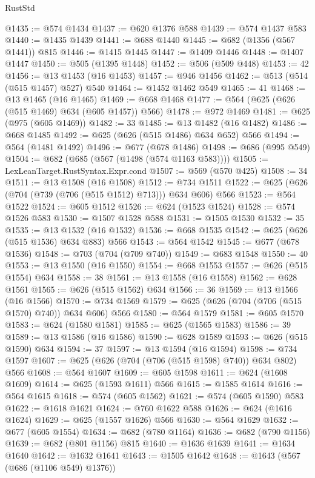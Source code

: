 \begin{lexlean}{RustStd}
\begin{coremodule}
@1435 := @574 @1434
@1437 := @620 @1376 @588
@1439 := @574 @1437 @583
@1440 := @1435 @1439
@1441 := @688 @1440
@1445 := @682 (@1356 (@567 @1441)) @815
@1446 := @1415 @1445
@1447 := @1409 @1446
@1448 := @1407 @1447
@1450 := @505 (@1395 @1448)
@1452 := @506 (@509 @448)
@1453 := 42
@1456 := @13 @1453 (@16 @1453)
@1457 := @946 @1456
@1462 := @513 (@514 (@515 @1457) @527) @540
@1464 := @1452 @1462 @549
@1465 := 41
@1468 := @13 @1465 (@16 @1465)
@1469 := @668 @1468
@1477 := @564 (@625 (@626 (@515 @1469) @634 (@605 @1457)) @566)
@1478 := @972 @1469
@1481 := @625 (@975 (@605 @1469))
@1482 := 33
@1485 := @13 @1482 (@16 @1482)
@1486 := @668 @1485
@1492 := @625 (@626 (@515 @1486) @634 @652) @566
@1494 := @564 (@1481 @1492)
@1496 := @677 (@678 @1486)
@1498 := @686 (@995 @549)
@1504 := @682 (@685 (@567 (@1498 (@574 @1163 @583))))
@1505 := LexLeanTarget.RustSyntax.Expr.cond
@1507 := @569 (@570 @425)
@1508 := 34
@1511 := @13 @1508 (@16 @1508)
@1512 := @734 @1511
@1522 := @625 (@626 (@704 (@739 (@706 (@515 @1512) @713))) @634 @606) @566
@1523 := @564 @1522
@1524 := @605 @1512
@1526 := @624 (@1523 @1524)
@1528 := @574 @1526 @583
@1530 := @1507 @1528 @588
@1531 := @1505 @1530
@1532 := 35
@1535 := @13 @1532 (@16 @1532)
@1536 := @668 @1535
@1542 := @625 (@626 (@515 @1536) @634 @883) @566
@1543 := @564 @1542
@1545 := @677 (@678 @1536)
@1548 := @703 (@704 (@709 @740))
@1549 := @683 @1548
@1550 := 40
@1553 := @13 @1550 (@16 @1550)
@1554 := @668 @1553
@1557 := @626 (@515 @1554) @634
@1558 := 38
@1561 := @13 @1558 (@16 @1558)
@1562 := @628 @1561
@1565 := @626 (@515 @1562) @634
@1566 := 36
@1569 := @13 @1566 (@16 @1566)
@1570 := @734 @1569
@1579 := @625 (@626 (@704 (@706 (@515 @1570) @740)) @634 @606) @566
@1580 := @564 @1579
@1581 := @605 @1570
@1583 := @624 (@1580 @1581)
@1585 := @625 (@1565 @1583)
@1586 := 39
@1589 := @13 @1586 (@16 @1586)
@1590 := @628 @1589
@1593 := @626 (@515 @1590) @634
@1594 := 37
@1597 := @13 @1594 (@16 @1594)
@1598 := @734 @1597
@1607 := @625 (@626 (@704 (@706 (@515 @1598) @740)) @634 @802) @566
@1608 := @564 @1607
@1609 := @605 @1598
@1611 := @624 (@1608 @1609)
@1614 := @625 (@1593 @1611) @566
@1615 := @1585 @1614
@1616 := @564 @1615
@1618 := @574 (@605 @1562)
@1621 := @574 (@605 @1590) @583
@1622 := @1618 @1621
@1624 := @760 @1622 @588
@1626 := @624 (@1616 @1624)
@1629 := @625 (@1557 @1626) @566
@1630 := @564 @1629
@1632 := @677 (@605 @1554)
@1634 := @682 (@780 @1164)
@1636 := @682 (@790 @1156)
@1639 := @682 (@801 @1156) @815
@1640 := @1636 @1639
@1641 := @1634 @1640
@1642 := @1632 @1641
@1643 := @1505 @1642
@1648 := @1643 (@567 (@686 (@1106 @549) @1376))

\end{coremodule}
\end{lexlean}
